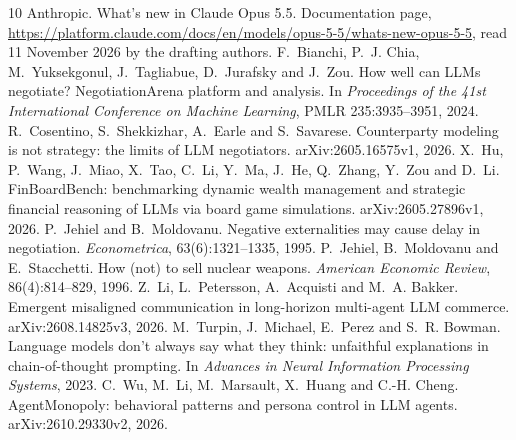 \documentclass[11pt,letterpaper]{article}
\begin{document}
\begin{thebibliography}{10}\small
{} Anthropic. What's new in Claude Opus 5.5. Documentation page, \url{https://platform.claude.com/docs/en/models/opus-5-5/whats-new-opus-5-5}, read 11 November 2026 by the drafting authors.
 F.~Bianchi, P.~J. Chia, M.~Yuksekgonul, J.~Tagliabue, D.~Jurafsky and J.~Zou. How well can LLMs negotiate? NegotiationArena platform and analysis. In \emph{Proceedings of the 41st International Conference on Machine Learning}, PMLR 235:3935--3951, 2024.
 R.~Cosentino, S.~Shekkizhar, A.~Earle and S.~Savarese. Counterparty modeling is not strategy: the limits of LLM negotiators. arXiv:2605.16575v1, 2026.
 X.~Hu, P.~Wang, J.~Miao, X.~Tao, C.~Li, Y.~Ma, J.~He, Q.~Zhang, Y.~Zou and D.~Li. FinBoardBench: benchmarking dynamic wealth management and strategic financial reasoning of LLMs via board game simulations. arXiv:2605.27896v1, 2026.
 P.~Jehiel and B.~Moldovanu. Negative externalities may cause delay in negotiation. \emph{Econometrica}, 63(6):1321--1335, 1995.
 P.~Jehiel, B.~Moldovanu and E.~Stacchetti. How (not) to sell nuclear weapons. \emph{American Economic Review}, 86(4):814--829, 1996.
 Z.~Li, L.~Petersson, A.~Acquisti and M.~A. Bakker. Emergent misaligned communication in long-horizon multi-agent LLM commerce. arXiv:2608.14825v3, 2026.
 M.~Turpin, J.~Michael, E.~Perez and S.~R. Bowman. Language models don't always say what they think: unfaithful explanations in chain-of-thought prompting. In \emph{Advances in Neural Information Processing Systems}, 2023.
 C.~Wu, M.~Li, M.~Marsault, X.~Huang and C.-H. Cheng. AgentMonopoly: behavioral patterns and persona control in LLM agents. arXiv:2610.29330v2, 2026.
\end{thebibliography}

\clearpage
\appendix
\end{document}
